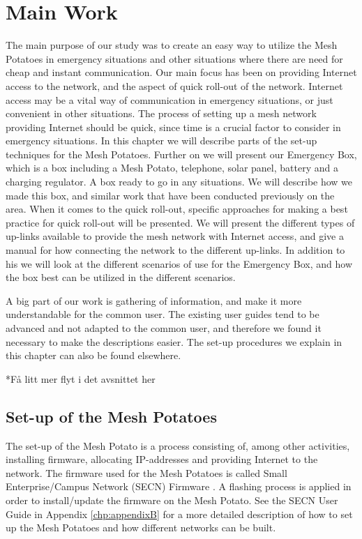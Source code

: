 \chapter{Main Work}
\label{chp:quickrollout} 

The main purpose of our study was to create an easy way to utilize the Mesh Potatoes in emergency situations and other situations where there are need for cheap and instant communication. Our main focus has been on providing Internet access to the network, and the aspect of quick roll-out of the network. Internet access may be a vital way of communication in emergency situations, or just convenient in other situations. The process of setting up a mesh network providing Internet should be quick, since time is a crucial factor to consider in emergency situations. In this chapter we will describe parts of the set-up techniques for the Mesh Potatoes. Further on we will present our Emergency Box, which is a box including a Mesh Potato, telephone, solar panel, battery and a charging regulator. A box ready to go in any situations. We will describe how we made this box, and similar work that have been conducted previously on the area. When it comes to the quick roll-out, specific approaches for making a best practice for quick roll-out will be presented. We will present the different types of up-links available to provide the mesh network with Internet access, and give a manual for how connecting the network to the different up-links. In addition to his we will look at the different scenarios of use for the Emergency Box, and how the box best can be utilized in the different scenarios. 

A big part of our work is gathering of information, and make it more understandable for the common user. The existing user guides tend to be advanced and not adapted to the common user, and therefore we found it necessary to make the descriptions easier. The set-up procedures we explain in this chapter can also be found elsewhere. 

*Få litt mer flyt i det avsnittet her

\section{Set-up of the Mesh Potatoes}
The set-up of the Mesh Potato is a process consisting of, among other activities, installing firmware, allocating IP-addresses and providing Internet to the network. The firmware used for the Mesh Potatoes is called Small Enterprise/Campus Network (SECN) Firmware \cite{ChoosingFirmware}. A flashing process is applied in order to install/update the firmware on the Mesh Potato. See the SECN User Guide in Appendix \ref{chp:appendixB} for a more detailed description of how to set up the Mesh Potatoes and how different networks can be built. 

